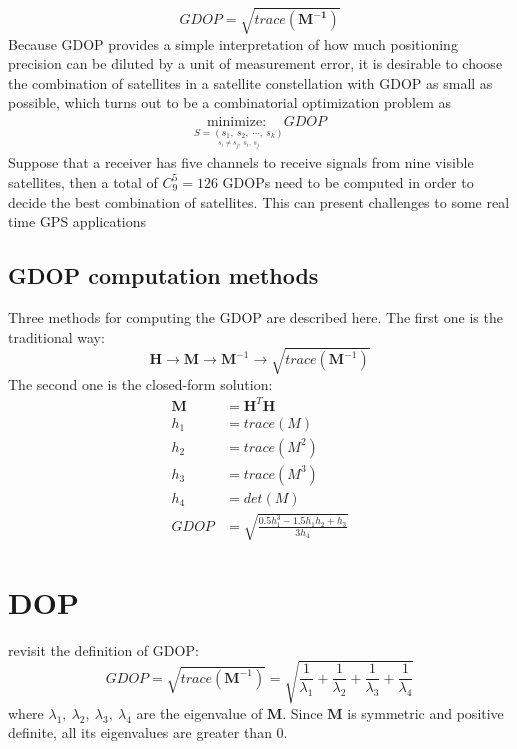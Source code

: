 \documentclass[a4paper]{report}
\begin{document}
\begin{equation}
GDOP=\sqrt{trace(\mathbf{M^{-1}})}
\end{equation}
Because GDOP provides a simple interpretation of how much positioning precision can be diluted by a unit of measurement error, it is desirable to choose the combination of satellites in a satellite constellation with GDOP as small as possible, which turns out to be a combinatorial optimization problem as
\begin{align}
\underset{\underset{s_i \neq s_j,\ s_i,\ s_j }{S=(s_1,\ s_2,\ \cdots,\ s_k)}}{\text{minimize:\ }} GDOP
\end{align}
Suppose that a receiver has five channels to receive signals from nine visible satellites, then a total of $C_9^{5} = 126$ GDOPs need to be computed in order to decide the best combination of satellites. This can present challenges to some real time GPS applications


\subsection{GDOP computation methods}
Three methods for computing the GDOP are described here.
The first one is the traditional way:
\begin{equation}
\mathbf{H} \to \mathbf{M} \to \mathbf{M}^{-1} \to \sqrt{trace(\mathbf{M}^{-1})}
\end{equation}
The second one is the closed-form solution:
\begin{align}
\mathbf{M}&=\mathbf{H}^T\mathbf{H} \\
h_1&=trace(M) \\
h_2&=trace(M^2) \\
h_3&=trace(M^3) \\
h_4&=det(M)\\
GDOP&=\sqrt{\frac{0.5h_1^3-1.5h_1h_2+h_3}{3h_4}}
\end{align}


\section{DOP}
revisit the definition of GDOP:
\begin{equation}
GDOP = \sqrt{trace(\mathbf{M}^{-1})}=\sqrt{\frac{1}{\lambda_1}+\frac{1}{\lambda_2}+\frac{1}{\lambda_3}+\frac{1}{\lambda_4}}
\label{eq_raw_dop1}
\end{equation}
where $\lambda_1,\ \lambda_2,\ \lambda_3,\ \lambda_4$ are the eigenvalue of $\mathbf{M}$. Since $\mathbf{M}$ is symmetric and positive definite, all its eigenvalues are greater than $0$. 
\end{document}

